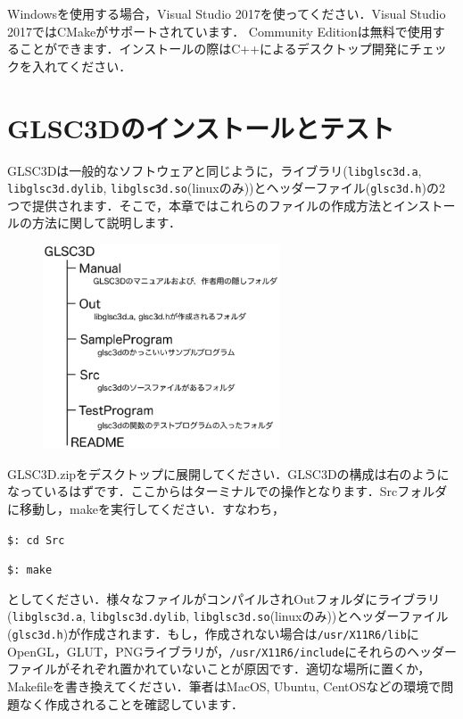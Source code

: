 \documentclass[a4paper,12pt]{jsarticle}%
\begin{document}
Windowsを使用する場合，Visual Studio 2017を使ってください．Visual Studio 2017ではCMakeがサポートされています．
Community Editionは無料で使用することができます．インストールの際はC++によるデスクトップ開発にチェックを入れてください．

\newpage
\section{GLSC3Dのインストールとテスト}

GLSC3Dは一般的なソフトウェアと同じように，ライブラリ(\verb|libglsc3d.a|, \verb|libglsc3d.dylib|, \verb|libglsc3d.so|(linuxのみ))とヘッダーファイル(\verb|glsc3d.h|)の2つで提供されます．そこで，本章ではこれらのファイルの作成方法とインストールの方法に関して説明します．

\begin{figure}
\vspace{-1\baselineskip}
	\includegraphics[width=70mm]{./Figures/eps/006.eps}
\end{figure}

GLSC3D.zipをデスクトップに展開してください．GLSC3Dの構成は右のようになっているはずです．ここからはターミナルでの操作となります．Srcフォルダに移動し，makeを実行してください．すなわち，

\verb|$: cd Src|

\verb|$: make|

\noindent
としてください．様々なファイルがコンパイルされOutフォルダにライブラリ(\verb|libglsc3d.a|, \verb|libglsc3d.dylib|, \verb|libglsc3d.so|(linuxのみ))とヘッダーファイル(\verb|glsc3d.h|)が作成されます．もし，作成されない場合は\verb|/usr/X11R6/lib|にOpenGL，GLUT，PNGライブラリが，\verb|/usr/X11R6/include|にそれらのヘッダーファイルがそれぞれ置かれていないことが原因です．適切な場所に置くか，Makefileを書き換えてください．筆者はMacOS, Ubuntu, CentOSなどの環境で問題なく作成されることを確認しています．
\end{document}
